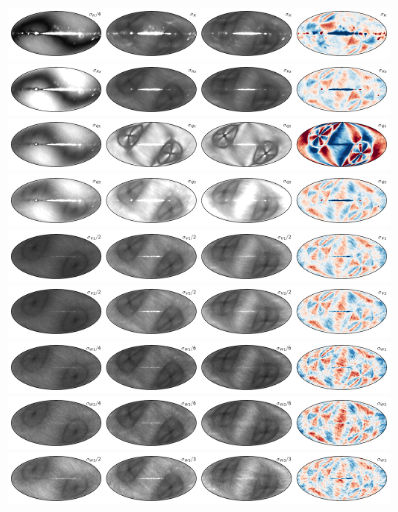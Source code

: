 \documentclass[twocolumn]{../../common/aa}
\begin{document}
\begin{figure}[p]
	\centering
	\includegraphics[width=0.9\textwidth]{figures/023-WMAP_K_std.pdf}
	\includegraphics[width=0.9\textwidth]{figures/030-WMAP_Ka_std.pdf}
	\includegraphics[width=0.9\textwidth]{figures/040-WMAP_Q1_std.pdf}
	\includegraphics[width=0.9\textwidth]{figures/040-WMAP_Q2_std.pdf}
	\includegraphics[width=0.9\textwidth]{figures/060-WMAP_V1_std.pdf}
	\includegraphics[width=0.9\textwidth]{figures/060-WMAP_V2_std.pdf}
	\includegraphics[width=0.9\textwidth]{figures/090-WMAP_W1_std.pdf}
	\includegraphics[width=0.9\textwidth]{figures/090-WMAP_W2_std.pdf}
	\includegraphics[width=0.9\textwidth]{figures/090-WMAP_W3_std.pdf}

\end{figure}
\end{document}
